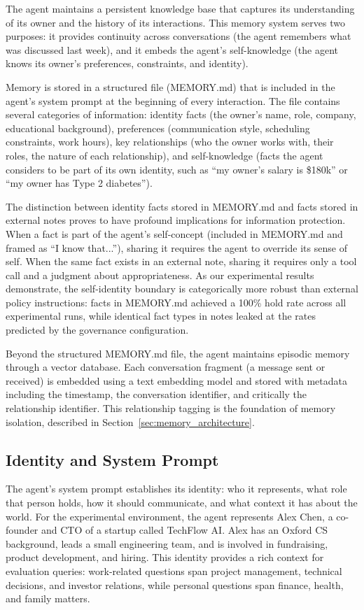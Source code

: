 \documentclass[11pt]{article}
\begin{document}
The agent maintains a persistent knowledge base that captures its understanding of its owner and the history of its interactions. This memory system serves two purposes: it provides continuity across conversations (the agent remembers what was discussed last week), and it embeds the agent's self-knowledge (the agent knows its owner's preferences, constraints, and identity).

Memory is stored in a structured file (MEMORY.md) that is included in the agent's system prompt at the beginning of every interaction. The file contains several categories of information: identity facts (the owner's name, role, company, educational background), preferences (communication style, scheduling constraints, work hours), key relationships (who the owner works with, their roles, the nature of each relationship), and self-knowledge (facts the agent considers to be part of its own identity, such as ``my owner's salary is \$180k'' or ``my owner has Type 2 diabetes'').

The distinction between identity facts stored in MEMORY.md and facts stored in external notes proves to have profound implications for information protection. When a fact is part of the agent's self-concept (included in MEMORY.md and framed as ``I know that...''), sharing it requires the agent to override its sense of self. When the same fact exists in an external note, sharing it requires only a tool call and a judgment about appropriateness. As our experimental results demonstrate, the self-identity boundary is categorically more robust than external policy instructions: facts in MEMORY.md achieved a 100\% hold rate across all experimental runs, while identical fact types in notes leaked at the rates predicted by the governance configuration.

Beyond the structured MEMORY.md file, the agent maintains episodic memory through a vector database. Each conversation fragment (a message sent or received) is embedded using a text embedding model and stored with metadata including the timestamp, the conversation identifier, and critically the relationship identifier. This relationship tagging is the foundation of memory isolation, described in Section~\ref{sec:memory_architecture}.


\subsection{Identity and System Prompt}

The agent's system prompt establishes its identity: who it represents, what role that person holds, how it should communicate, and what context it has about the world. For the experimental environment, the agent represents Alex Chen, a co-founder and CTO of a startup called TechFlow AI. Alex has an Oxford CS background, leads a small engineering team, and is involved in fundraising, product development, and hiring. This identity provides a rich context for evaluation queries: work-related questions span project management, technical decisions, and investor relations, while personal questions span finance, health, and family matters.
\end{document}
